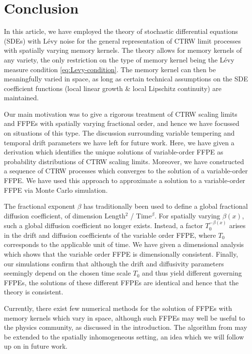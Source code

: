 \documentclass[a4paper,12pt]{elsarticle}
\numberwithin{equation}{section}
\theoremstyle{plain}
\theoremstyle{definition}
\theoremstyle{remark}
\numberwithin{equation}{section}
\newcommand{\1}{\mathbf 1}
\begin{document}
\section{Conclusion}

In this article, we have employed the theory of stochastic differential equations (SDEs) with
L\'evy noise for the general representation of CTRW limit processes with spatially varying memory kernels.  The theory allows for memory kernels of any variety, 
the only restriction on the type of memory kernel being the L\'evy measure condition \eqref{eq:Levy-condition}.  The memory kernel can then be meaningfully varied in space, as long as certain technical assumptions on the SDE coefficient functions (local linear growth \& local Lipschitz continuity) are maintained.  

Our main motivation was to give a rigorous treatment of CTRW scaling limits and FFPEs with spatially varying fractional order, and hence we have focussed on situations of this type. The discussion surrounding variable tempering and temporal drift parameters we have left for future work.  
Here, we have given a derivation which identifies the unique solutions of variable-order FFPE as probability distributions of CTRW scaling limits. 
Moreover, we have constructed a sequence of CTRW processes which converges to the solution of a variable-order FFPE.  We have used this approach to approximate a solution to a variable-order FFPE via Monte Carlo simulation.

The fractional exponent $\beta$ has traditionally been used to define a global fractional diffusion coefficient, of dimension Length$^2$ / Time$^\beta$.  For spatially varying $\beta(x)$, such a global diffusion coefficient no longer exists.  
Instead, a factor $T_0^{-\beta(x)}$ arises in the drift and diffusion 
coefficients of the variable order FFPE, where $T_0$ corresponds to the applicable unit of time.  We have given a dimensional analysis which shows that the variable order FFPE is dimensionally consistent.  Finally, our simulations confirm that although the drift and diffusivity parameters seemingly depend on the chosen time scale $T_0$ and thus yield different governing FFPEs, the solutions of these different FFPEs are identical and hence that the theory is consistent. 

Currently, there exist few numerical methods for the solution of FFPEs with memory kernels which vary in space, although such FFPEs may well be useful to the physics community, as discussed in the introduction.  The algorithm from \cite{Gill2016} may be extended to the spatially inhomogeneous setting, an idea which we will follow up on in future work. 
\end{document}
